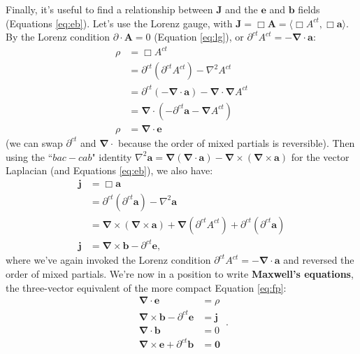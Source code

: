 \documentclass[12pt]{article}
\renewcommand{\vv}[1]{\mathbf{#1}}
\newcommand{\del}{\boldsymbol{\nabla}}
\begin{document}
Finally, it's useful to find a relationship between $\vv J$ and the $\vv e$ and $\vv b$ fields (Equations \ref{eq:eb}). Let's use the Lorenz gauge, with $\vv J= \Box \vv A = \langle \Box A^{ct}, \Box \vv a \rangle$. By the Lorenz condition ${\partialup \cdot \vv A = 0}$ (Equation \ref{eq:lg}), or $\partial^{ct} A^{ct} = - \del \cdot \vv a$:
\begin{equation}\label{eq:ace}
\begin{split}
\rho &= \Box A^{ct} \\
&= \partial^{ct} (\partial^{ct} A^{ct}) - \nabla ^2 A^{ct} \\
&= \partial^{ct} (- \del \cdot \vv a) - \del \cdot \del A^{ct} \\
&= \del \cdot (- \partial^{ct} \vv a - \del A^{ct}) \\
\rho &= \del \cdot \vv e
\end{split}
\end{equation}
(we can swap $\partial^{ct}$ and $\del \cdot$ because the order of mixed partials is reversible). Then using the ``$bac - cab$" identity ${\nabla ^2 \vv a = \del(\del \cdot \vv a) - \del \times (\del \times \vv a)}$ for the vector Laplacian (and Equations \ref{eq:eb}), we also have:
\begin{equation}\label{eq:abe}
\begin{split}
\vv j &= \Box \vv a \\
&= \partial^{ct} (\partial^{ct} \vv a) - \nabla ^2 \vv a \\
&= \del \times (\del \times \vv a) + \del(\partial^{ct} A^{ct}) + \partial^{ct} (\partial^{ct} \vv a) \\
\vv j &=  \del \times \vv b - \partial^{ct} \vv e ,
\end{split}
\end{equation}
where we've again invoked the Lorenz condition $\partial^{ct} A^{ct} = - \del \cdot \vv a$ and reversed the order of mixed partials. We're now in a position to write \textbf{Maxwell's equations}, the three-vector equivalent of the more compact Equation \ref{eq:fp}:
\begin{equation}\label{eq:me}
\boxed{
\begin{aligned}
\del \cdot \vv e &= \rho \\
\del \times \vv b - \partial^{ct} \vv e &= \vv j \\ 
\del \cdot \vv b &= 0 \\
\del \times \vv e + \partial^{ct} \vv b &= \vv 0
\end{aligned}
} \, .
\end{equation}
\end{document}
